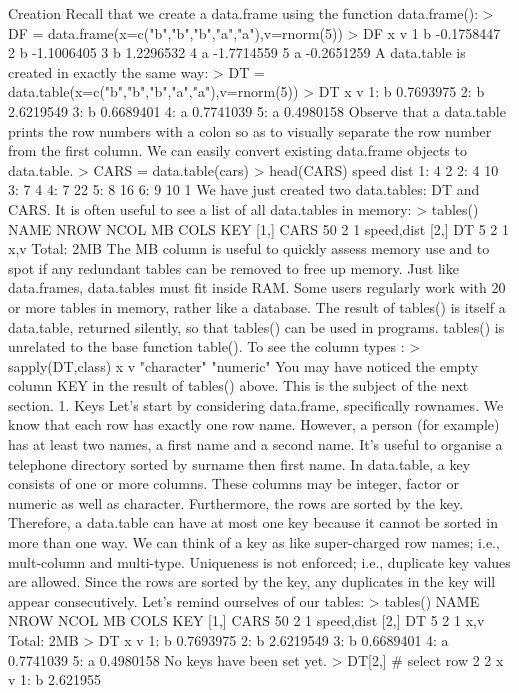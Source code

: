Creation
Recall that we create a data.frame using the function data.frame():
> DF = data.frame(x=c("b","b","b","a","a"),v=rnorm(5))
> DF
x v
1 b -0.1758447
2 b -1.1006405
3 b 1.2296532
4 a -1.7714559
5 a -0.2651259
A data.table is created in exactly the same way:
> DT = data.table(x=c("b","b","b","a","a"),v=rnorm(5))
> DT
x v
1: b 0.7693975
2: b 2.6219549
3: b 0.6689401
4: a 0.7741039
5: a 0.4980158
Observe that a data.table prints the row numbers with a colon so as to visually separate the row
number from the first column. We can easily convert existing data.frame objects to data.table.
> CARS = data.table(cars)
> head(CARS)
speed dist
1: 4 2
2: 4 10
3: 7 4
4: 7 22
5: 8 16
6: 9 10
1
We have just created two data.tables: DT and CARS. It is often useful to see a list of all
data.tables in memory:
> tables()
NAME NROW NCOL MB COLS KEY
[1,] CARS 50 2 1 speed,dist
[2,] DT 5 2 1 x,v
Total: 2MB
The MB column is useful to quickly assess memory use and to spot if any redundant tables can
be removed to free up memory. Just like data.frames, data.tables must fit inside RAM.
Some users regularly work with 20 or more tables in memory, rather like a database. The result
of tables() is itself a data.table, returned silently, so that tables() can be used in programs.
tables() is unrelated to the base function table().
To see the column types :
> sapply(DT,class)
x v
"character" "numeric"
You may have noticed the empty column KEY in the result of tables() above. This is the
subject of the next section.
1. Keys
Let’s start by considering data.frame, specifically rownames. We know that each row has exactly
one row name. However, a person (for example) has at least two names, a first name and a second
name. It’s useful to organise a telephone directory sorted by surname then first name.
In data.table, a key consists of one or more columns. These columns may be integer, factor or
numeric as well as character. Furthermore, the rows are sorted by the key. Therefore, a data.table
can have at most one key because it cannot be sorted in more than one way. We can think of a
key as like super-charged row names; i.e., mult-column and multi-type.
Uniqueness is not enforced; i.e., duplicate key values are allowed. Since the rows are sorted by
the key, any duplicates in the key will appear consecutively.
Let’s remind ourselves of our tables:
> tables()
NAME NROW NCOL MB COLS KEY
[1,] CARS 50 2 1 speed,dist
[2,] DT 5 2 1 x,v
Total: 2MB
> DT
x v
1: b 0.7693975
2: b 2.6219549
3: b 0.6689401
4: a 0.7741039
5: a 0.4980158
No keys have been set yet.
> DT[2,] # select row 2
2
x v
1: b 2.621955

